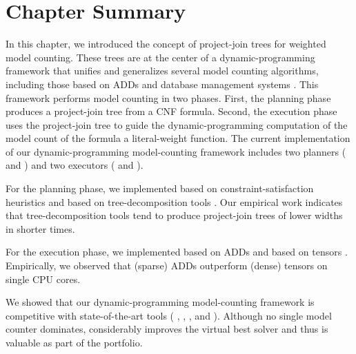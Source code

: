 \section{Chapter Summary}
\label{sec_discussion}

In this chapter, we introduced the concept of project-join trees for weighted model counting.
These trees are at the center of a dynamic-programming framework that unifies and generalizes several model counting algorithms, including those based on ADDs \cite{DPV20} and database management systems \cite{fichte2020exploiting}.
This framework performs model counting in two phases.
First, the planning phase produces a project-join tree from a CNF formula.
Second, the execution phase uses the project-join tree to guide the dynamic-programming computation of the model count of the formula \wrt{} a literal-weight function.
The current implementation of our dynamic-programming model-counting framework \Dpmc{} includes two planners (\Htb{} and \Lg) and two executors (\Dmc{} and \Tensor{}).

For the planning phase, we implemented \Htb{} based on constraint-satisfaction heuristics
\cite{tarjan1984simple,koster2001treewidth,dechter03,dechter99,bouquet1999gestion}
and \Lg{} based on tree-decomposition tools \cite{strasser2017computing,Tamaki17,AMW17}.
Our empirical work indicates that tree-decomposition tools tend to produce project-join trees of lower widths in shorter times.

For the execution phase, we implemented \Dmc{} based on ADDs \cite{DPV20,somenzi2015cudd} and \Tensor{} based on tensors \cite{numpy}.
Empirically, we observed that (sparse) ADDs outperform (dense) tensors on single CPU cores.

We showed that our dynamic-programming model-counting framework \Dpmc{} is competitive with state-of-the-art tools (\cachet{} \cite{sang2004combining}, \ctd{} \cite{darwiche2004new}, \df{} \cite{LM17}, and \minictd{} \cite{OD15}).
Although no single model counter dominates, \Dpmc{} considerably improves the virtual best solver and thus is valuable as part of the portfolio.